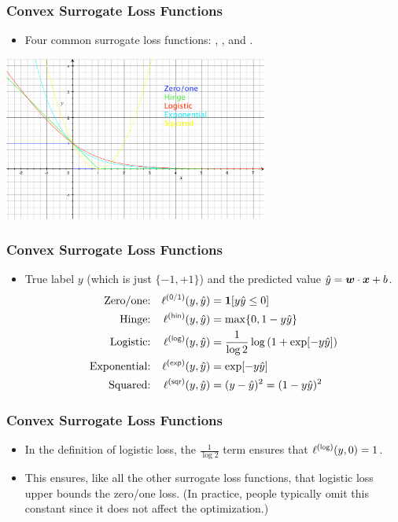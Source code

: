 \documentclass[trans]{beamer}
\begin{document}
\begin{frame}
  \frametitle{Convex Surrogate Loss Functions}
\begin{itemize}
\item
Four common surrogate loss functions: , ,
 and . 
\end{itemize}
\begin{center}
 \includegraphics[width=0.65\textwidth]{loss}
\end{center}
\end{frame}

\begin{frame}
  \frametitle{Convex Surrogate Loss Functions}
\begin{itemize}
\item True label $y$ (which is just $\{-1,+1\}$) and
the predicted value $\hat y = {\boldsymbol{w}} \cdot {\boldsymbol{x}}+b$.
%
\begin{align}
\text{Zero/one:}    && \ell\xth{0/1}(y,\hat y) &= \Ind[y \hat y \leq 0] \\
\text{Hinge:}       && \ell\xth{hin}(y,\hat y) &= \max \{ 0, 1-y\hat y \}\\
\text{Logistic:}    && \ell\xth{log}(y,\hat y) &= \frac 1 {\log2} \log\left( 1 + \exp[-y\hat y]\right)\\
\text{Exponential:} && \ell\xth{exp}(y,\hat y) &= \exp[-y\hat y]\\
\text{Squared:}     && \ell\xth{sqr}(y,\hat y) &= (y-\hat y)^2=(1-y\hat y)^2
\end{align}
%
\end{itemize}
\end{frame}

\begin{frame}
  \frametitle{Convex Surrogate Loss Functions}
\begin{itemize}
\item
In the definition of logistic loss, the $\frac 1 {\log2}$ term ensures that $\ell\xth{log}(y,0) = 1$. 
\item  This
ensures, like all the other surrogate loss functions, that logistic
loss upper bounds the zero/one loss.  (In practice, people typically
omit this constant since it does not affect the optimization.)
\end{itemize}
\end{frame}
\end{document}
